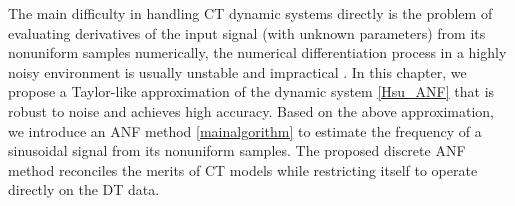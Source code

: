 \documentclass{UCF_ETD}
\begin{document}
 The main difficulty in handling CT dynamic systems directly is the problem of evaluating
  derivatives of the input signal (with unknown parameters) from its nonuniform samples numerically, the numerical differentiation process in a highly noisy environment is usually unstable and impractical \cite{Tseng01, Papoulis77,Cheung85}.
  In this chapter, we propose a Taylor-like approximation of the dynamic system \eqref{Hsu_ANF}
   that is robust to noise and achieves high accuracy. Based on the above approximation,
 we introduce an ANF  method \eqref{mainalgorithm}  to estimate the frequency of a sinusoidal signal from its
 nonuniform samples. The proposed discrete ANF method reconciles the merits of CT models while restricting itself to operate directly on the DT data.













\end{document}
